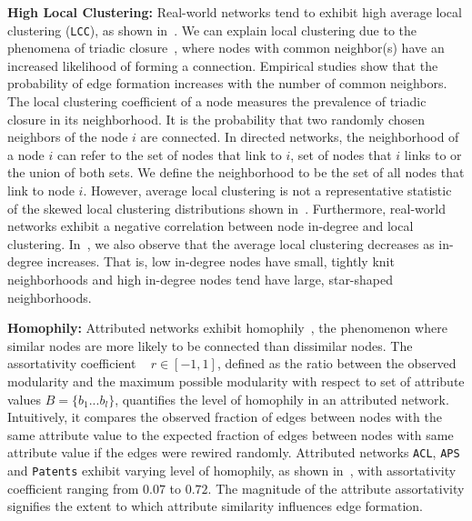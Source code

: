 \textbf{High Local Clustering:} Real-world networks tend to exhibit high average local clustering (\texttt{LCC}), as shown in~. We can explain local clustering due to the phenomena of triadic closure~\cite{simmel1950sociology,
newman2001clustering}, where nodes with common neighbor(s) have an increased
likelihood of forming a connection.
Empirical studies
\cite{kossinets2006empirical} show that the probability of edge formation
increases with the number of common neighbors.
The local clustering coefficient of a node measures the prevalence of triadic closure in its neighborhood. It is the probability that two randomly chosen neighbors of the node $i$ are connected. In directed networks, the neighborhood of a node $i$ can refer to the
set of nodes that link to $i$, set of nodes that $i$ links to or the union of
both sets. We define the neighborhood to be the set of all nodes that link to
node $i$.  However, average local clustering is not a
representative statistic of the {skewed} local clustering distributions
shown in~. Furthermore, real-world networks exhibit a negative
correlation between node in-degree  and local clustering. In~, we
also observe that the average local clustering  decreases as in-degree increases.
That is, low in-degree nodes have small, tightly knit neighborhoods and high
in-degree nodes tend have large, star-shaped neighborhoods.



\textbf{Homophily:}
Attributed networks exhibit homophily~\cite{mcpherson2001birds}, the phenomenon where similar nodes are more likely
to be connected than dissimilar nodes. The assortativity coefficient
~\cite{newman2002assortative} $r \in [-1, 1]$,
defined as the ratio between the observed modularity and
the maximum possible modularity with respect to set of attribute values $B=\{b_1...b_l\}$,
quantifies the level of homophily in an attributed network. Intuitively, it
compares the observed fraction of edges between nodes with the same attribute
value to the expected fraction of edges between nodes with same attribute value
if the edges were rewired randomly.
Attributed networks \texttt{ACL}, \texttt{APS} and \texttt{Patents} exhibit
varying level of homophily, as shown in~, with assortativity
coefficient ranging from $0.07$ to $0.72$.
The magnitude of the attribute assortativity
signifies the extent to which attribute similarity influences edge formation.


